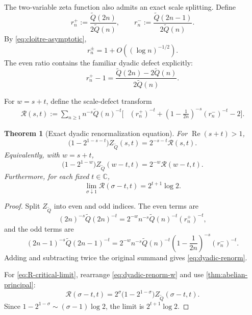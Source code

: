 \documentclass[11pt]{article}
\newtheorem{theorem}{Theorem}[section]
\theoremstyle{definition}
\theoremstyle{remark}
\newcommand{\Qp}{\widetilde Q}
\newcommand{\C}{\mathbb C}
\newcommand{\RePart}{\operatorname{Re}}
\begin{document}
The two-variable zeta function also admits an exact scale splitting.  Define
\begin{equation}
r_n^+:=\frac{\Qp(2n)}{2\Qp(n)},
\qquad
r_n^-:=\frac{\Qp(2n-1)}{2\Qp(n)}.
\label{eq:rplusminus}
\end{equation}
By \eqref{eq:cloitre-asymptotic},
\begin{equation}
r_n^\pm=1+O\!\left((\log n)^{-1/2}\right).
\label{eq:rplusminus-asymptotic}
\end{equation}
The even ratio contains the familiar dyadic defect explicitly:
\[
r_n^+-1
=\frac{\Qp(2n)-2\Qp(n)}{2\Qp(n)}.
\]

For \(w=s+t\), define the scale-defect transform
\begin{align}
\mathscr R(s,t)
:=\sum_{n\ge1}n^{-s}\Qp(n)^{-t}
\Bigg[& (r_n^+)^{-t}
+\left(1-\frac1{2n}\right)^{-s}(r_n^-)^{-t}
-2\Bigg].
\label{eq:scale-defect-transform}
\end{align}

\begin{theorem}[Exact dyadic renormalization equation]
\label{thm:dyadic-renorm}
For \(\RePart(s+t)>1\),
\begin{equation}
\boxed{
\bigl(1-2^{1-s-t}\bigr)Z_{\Qp}(s,t)
=2^{-s-t}\mathscr R(s,t).
}
\label{eq:dyadic-renorm}
\end{equation}
Equivalently, with \(w=s+t\),
\begin{equation}
\bigl(1-2^{1-w}\bigr)Z_{\Qp}(w-t,t)
=2^{-w}\mathscr R(w-t,t).
\label{eq:dyadic-renorm-w}
\end{equation}
Furthermore, for each fixed \(t\in\C\),
\begin{equation}
{
\lim_{\sigma\downarrow1}
\mathscr R(\sigma-t,t)
=2^{t+1}\log2.
}
\label{eq:R-critical-limit}
\end{equation}
\end{theorem}

\begin{proof}
Split \(Z_{\Qp}\) into even and odd indices.  The even terms are
\[
(2n)^{-s}\Qp(2n)^{-t}
=2^{-w}n^{-s}\Qp(n)^{-t}(r_n^+)^{-t},
\]
and the odd terms are
\[
(2n-1)^{-s}\Qp(2n-1)^{-t}
=2^{-w}n^{-s}\Qp(n)^{-t}
\left(1-\frac1{2n}\right)^{-s}(r_n^-)^{-t}.
\]
Adding and subtracting twice the original summand gives \eqref{eq:dyadic-renorm}.

For \eqref{eq:R-critical-limit}, rearrange \eqref{eq:dyadic-renorm-w} and use \cref{thm:abelian-principal}:
\[
\mathscr R(\sigma-t,t)
=2^\sigma\bigl(1-2^{1-\sigma}\bigr)Z_{\Qp}(\sigma-t,t).
\]
Since \(1-2^{1-\sigma}\sim(\sigma-1)\log2\), the limit is \(2^{t+1}\log2\).
\end{proof}
\end{document}

